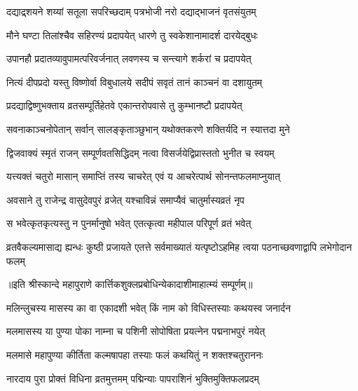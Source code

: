 \twolineshloka
{दद्याद्र्शयने शय्यां सतूला सपरिच्छदाम्}
{पत्रभोजी नरो दद्याद्भाजनं वृतसंयुतम्} %

\twolineshloka
{मौने घण्टा तिलांश्चैव सहिरण्यं प्रदापयेत्}
{धारणे तु स्वकेशानामादर्श दारयेद्बुधः} %

\twolineshloka
{उपानहौ प्रदातव्यावुपामत्परिवर्जनात्}
{लवणस्य च सन्त्यागे शर्करां च प्रदापयेत्} %

\twolineshloka
{नित्यं दीपप्रदो यस्तु विष्णोर्वा विबुधालये}
{सदीपं सवृतं तानं काञ्चनं वा दशायुतम्} %

\twolineshloka
{प्रदद्याद्विष्णुभक्ताय व्रतसम्पूर्तिहेतवे}
{एकान्तरोपवासे तु कुम्भानष्टौ प्रदापयेत्} %

\twolineshloka
{सवनाकाञ्चनोपेतान् सर्वान् सालङ्कृताञ्छुभान्}
{यथोक्तकरणे शक्तिर्यदि न स्यात्तदा मुने} %

\twolineshloka
{द्विजवाक्यं स्मृतं राजन् सम्पूर्णवतसिद्धिदम्}
{नत्वा विसर्जयेद्विप्रास्ततो भुनीत च स्वयम्} %

\twolineshloka
{यत्त्यक्तं चतुरो मासान् समाप्तिं तस्य चाचरेत्}
{एवं य आचरेत्पार्थ सोनन्तफलमाप्नुयात्} %

\twolineshloka
{अवसाने तु राजेन्द्र वासुदेवपुरं व्रजेत्}
{यश्चाविन्नं समाप्यैवं चातुर्मास्यव्रतं नृप} %

\twolineshloka
{स भवेत्कृतकृत्यस्तु न पुनर्मानुषो भवेत्}
{एतत्कृत्वा महीपाल परिपूर्ण व्रतं भवेत्} %

\threelineshloka
{व्रतवैकल्यमासाद्य ह्यन्धः कुष्ठी प्रजायते}
{एतत्ते सर्वमाख्यातं यत्पृष्टोऽहमिह त्वया}
{पठनाच्छवणाद्वापि लभेगोदान फलम्} %

॥इति श्रीस्कान्दे महापुराणे कार्त्तिकशुक्लप्रबोधिन्येकादाशीमाहात्म्यं सम्पूर्णम्॥


\hyperref[sec:ekadashi_mahatmyam_vrata_raja]{\closesub}
\clearpage

\label{sec:vrata-raja-purushottama-shukla-kamada}


\twolineshloka
{मलिन्लुचस्य मासस्य का वा एकादशी भवेत्}
{किं नाम को विधिस्तस्याः कथयस्व जनार्दन} %


\twolineshloka
{मलमासस्य या पुण्या पोका नाम्ना च पशिनी}
{सोपोषिता प्रयत्नेन पद्मनाभपुरं नयेत्} %

\twolineshloka
{मलमासे महापुण्या कीर्तिता कल्मषापहा}
{तस्याः फलं कथयितुं न शक्तश्चतुराननः} %

\twolineshloka
{नारदाय पुरा प्रोक्तं विधिना व्रतमुत्तमम्}
{पद्मिन्याः पापराशिनं भुक्तिमुक्तिफलप्रदम्} %

